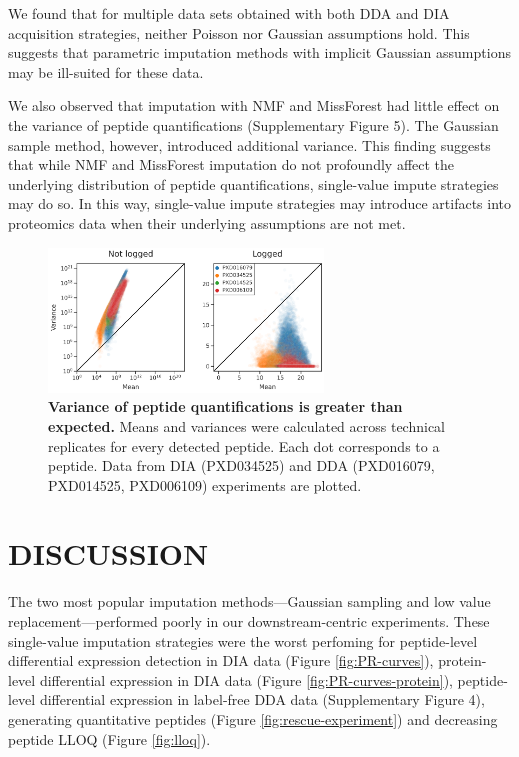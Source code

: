 \documentclass{article}
\begin{document}
We found that for multiple data sets obtained with both DDA and DIA acquisition strategies, neither Poisson nor Gaussian assumptions hold. This suggests that parametric imputation methods with implicit Gaussian assumptions may be ill-suited for these data. 

We also observed that imputation with NMF and MissForest had little effect on the variance of peptide quantifications (Supplementary Figure 5). The Gaussian sample method, however, introduced additional variance. This finding suggests that while NMF and MissForest imputation do not profoundly affect the underlying distribution of peptide quantifications, single-value impute strategies may do so. In this way, single-value impute strategies may introduce artifacts into proteomics data when their underlying assumptions are not met.

\begin{figure}
  \centering
  \includegraphics[width=0.65\textwidth]{figures/mean-variance-peptide-figure.pdf}
  \caption{{\bf Variance of peptide quantifications is greater than expected.} Means and variances were calculated across technical replicates for every detected peptide. Each dot corresponds to a peptide. Data from DIA (PXD034525) and DDA (PXD016079, PXD014525, PXD006109) experiments are plotted.}
  \label{fig:mean-x-var}
\end{figure} 

\section{DISCUSSION}

The two most popular imputation methods---Gaussian sampling and low value replacement---performed poorly in our downstream-centric experiments. These single-value imputation strategies were the worst perfoming for peptide-level differential expression detection in DIA data (Figure \ref{fig:PR-curves}), protein-level differential expression in DIA data (Figure \ref{fig:PR-curves-protein}), peptide-level differential expression in label-free DDA data (Supplementary Figure 4), generating quantitative peptides (Figure \ref{fig:rescue-experiment}) and decreasing peptide LLOQ (Figure \ref{fig:lloq}). 
\end{document}
